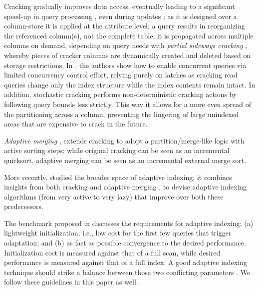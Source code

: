 Cracking gradually improves data access, eventually leading to a significant speed-up in query
processing \cite{IKM:CIDR07,IKM:SIGMOD09}, even during updates \cite{IKM:SIGMOD07};
%
as it is designed over a column-store it is applied at the attribute level; a query results in reorganizing the
referenced column(s), not the complete table;
it is propagated across multiple columns on demand,
depending on query needs with \emph{partial sideways cracking} \cite{IKM:SIGMOD09}, whereby
pieces of cracker columns are dynamically created and deleted based on storage restrictions.
In \cite{Concurrency}, the authors show how to enable concurrent queries via limited concurrency control effort, 
relying purely on latches as cracking read queries change only the index structure while the index contents remain intact.
In addition, stochastic cracking \cite{StochasticCracking} 
performs non-deterministic cracking actions by following query bounds less strictly. This way it allows for a more even spread of the partitioning across a column, preventing the lingering of large unindexed areas that are expensive to crack in the future.



\emph{Adaptive merging} \cite{GK10a,GK10b}, extends cracking
to adopt a partition/merge\hyp{}like logic with active sorting steps;
while original cracking can be seen as an incremental quicksort,
adaptive merging can be seen as an incremental external merge sort.

More recently, \cite{AdaptiveIndexing} studied the broader space of adaptive indexing;
it combines insights from both cracking \cite{IKM:CIDR07} and adaptive merging \cite{GK10a,GK10b},
to devise adaptive indexing algorithms (from very active to very lazy) that improve over both these predecessors.
%

The benchmark proposed in \cite{GIKM10} discusses
the requirements for adaptive indexing;
(a) lightweight initialization, i.e., low cost for the first few queries
that trigger adaptation; and (b) as fast as possible convergence to the desired performance.
Initialization cost is measured against that of a full scan, while
desired performance is measured against that of a full index.
A good adaptive indexing technique should strike a balance between those
two conflicting parameters \cite{GIKM10,AdaptiveIndexing}.
We follow these guidelines in this paper as well.


